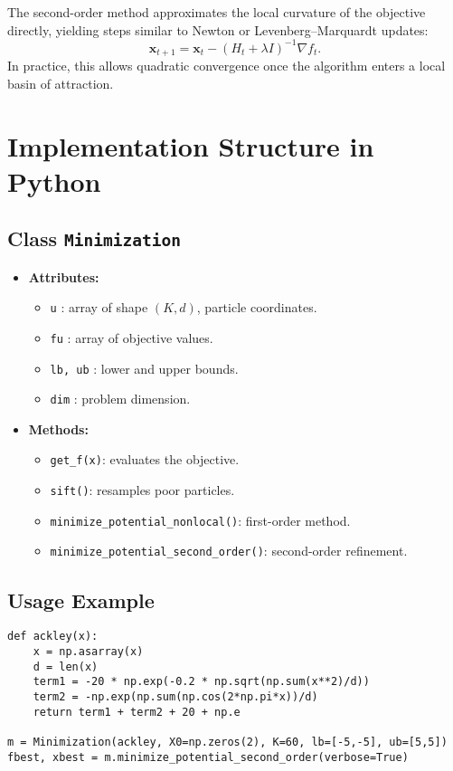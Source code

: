 \documentclass[12pt]{article}
\begin{document}
The second-order method approximates the local curvature of the objective directly, yielding steps similar to Newton or Levenberg–Marquardt updates:
\[
\mathbf{x}_{t+1} = \mathbf{x}_t - (H_t + \lambda I)^{-1} \nabla f_t.
\]
In practice, this allows quadratic convergence once the algorithm enters a local basin of attraction.

\section{Implementation Structure in Python}

\subsection{Class \texttt{Minimization}}
\begin{itemize}
    \item \textbf{Attributes:}
        \begin{itemize}
            \item \texttt{u} : array of shape $(K, d)$, particle coordinates.
            \item \texttt{fu} : array of objective values.
            \item \texttt{lb, ub} : lower and upper bounds.
            \item \texttt{dim} : problem dimension.
        \end{itemize}
    \item \textbf{Methods:}
        \begin{itemize}
            \item \texttt{get\_f(x)}: evaluates the objective.
            \item \texttt{sift()}: resamples poor particles.
            \item \texttt{minimize\_potential\_nonlocal()}: first-order method.
            \item \texttt{minimize\_potential\_second\_order()}: second-order refinement.
        \end{itemize}
\end{itemize}

\subsection{Usage Example}

\begin{verbatim}
def ackley(x):
    x = np.asarray(x)
    d = len(x)
    term1 = -20 * np.exp(-0.2 * np.sqrt(np.sum(x**2)/d))
    term2 = -np.exp(np.sum(np.cos(2*np.pi*x))/d)
    return term1 + term2 + 20 + np.e

m = Minimization(ackley, X0=np.zeros(2), K=60, lb=[-5,-5], ub=[5,5])
fbest, xbest = m.minimize_potential_second_order(verbose=True)
\end{verbatim}
\end{document}
